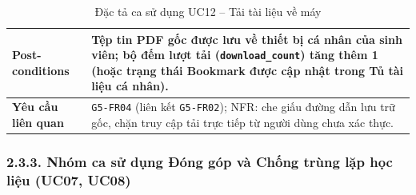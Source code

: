 \begin{table}[H]
\begin{tabularx}{\textwidth}{|p{3.5cm}|X|}
\hline
\textbf{Post-conditions} & Tệp tin PDF gốc được lưu về thiết bị cá nhân của sinh viên; bộ đếm lượt tải (\texttt{download\_count}) tăng thêm 1 (hoặc trạng thái Bookmark được cập nhật trong Tủ tài liệu cá nhân). \\
\hline
\textbf{Yêu cầu liên quan} & \texttt{G5-FR04} (liên kết \texttt{G5-FR02}); NFR: che giấu đường dẫn lưu trữ gốc, chặn truy cập tải trực tiếp từ người dùng chưa xác thực. \\
\hline
\end{tabularx}
\caption{Đặc tả ca sử dụng UC12 -- Tải tài liệu về máy}
\label{tab:uc12}
\end{table}


\subsubsection{2.3.3. Nhóm ca sử dụng Đóng góp và Chống trùng lặp học liệu (UC07, UC08)}

